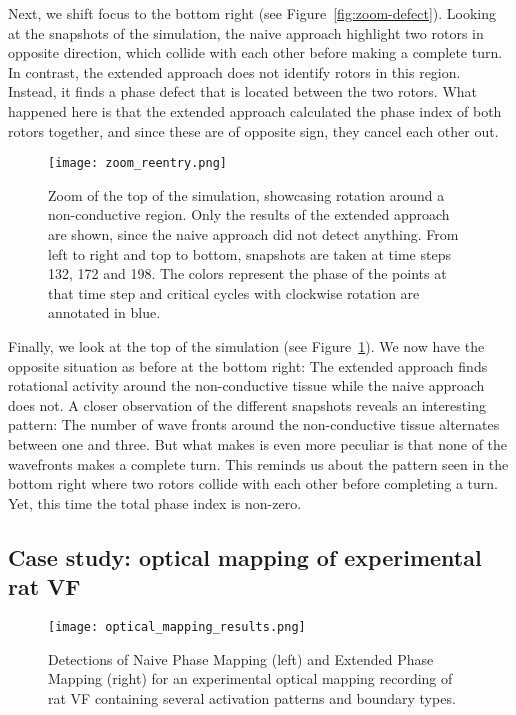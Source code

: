 \documentclass[twocolumn]{article}
\begin{document}
Next, we shift focus to the bottom right (see
Figure~\ref{fig:zoom-defect}). Looking at the snapshots of the simulation,
the naive approach highlight two rotors in opposite direction, which
collide with each other before making a complete turn. In contrast, the
extended approach does not identify rotors in this region. Instead, it
finds a phase defect that is located between the two rotors. What
happened here is that the extended approach calculated the phase index
of both rotors together, and since these are of opposite sign, they
cancel each other out.

\begin{figure}[ht]
  \centering
  \texttt{[image: zoom\_reentry.png]}
  \caption{Zoom of the top of the simulation, showcasing rotation around a
    non-conductive region. Only the results of the extended approach are
    shown, since the naive approach did not detect anything. From left to
    right and top to bottom, snapshots are taken at time steps 132, 172 and
    198. The colors represent the phase of the points at that time step and
  critical cycles with clockwise rotation are annotated in blue.}
  \label{fig:zoom-reentry}
\end{figure}

Finally, we look at the top of the simulation (see
Figure~\ref{fig:zoom-reentry}). We now have the opposite situation as
before at the bottom right: The extended approach finds rotational
activity around the non-conductive tissue while the naive approach does
not. A closer observation of the different snapshots reveals an
interesting pattern: The number of wave fronts around the non-conductive
tissue alternates between one and three. But what makes is even more
peculiar is that none of the wavefronts makes a complete turn. This
reminds us about the pattern seen in the bottom right where two rotors
collide with each other before completing a turn. Yet, this time the
total phase index is non-zero.

\subsection{Case study: optical mapping of experimental rat VF}

\begin{figure}[ht]
  \centering
  \texttt{[image: optical\_mapping\_results.png]}
  \caption{Detections of Naive Phase Mapping (left) and Extended Phase Mapping (right) for an experimental optical mapping recording of rat VF containing several activation patterns and boundary types.}
  \label{fig:optical_mapping_results}
\end{figure}
\end{document}
